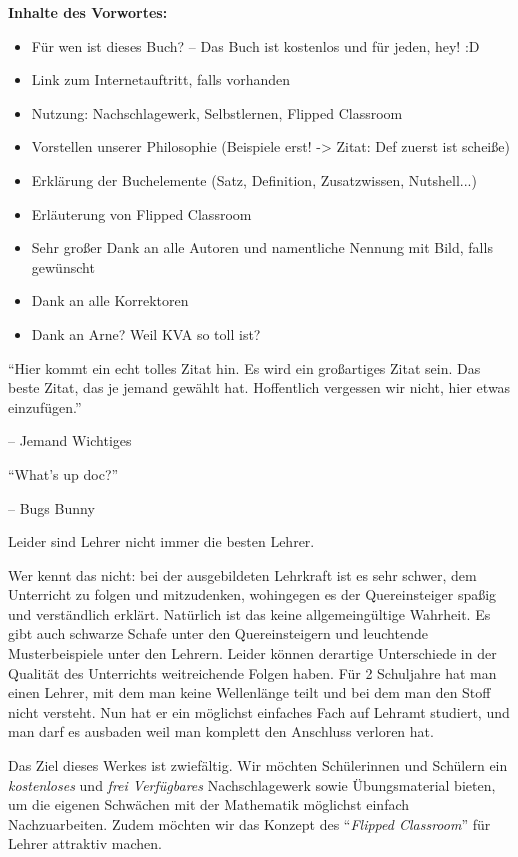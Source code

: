 \documentclass[../main.tex]{subfiles}
\begin{document}
\textbf{Inhalte des Vorwortes:}
\begin{itemize}
    \item Für wen ist dieses Buch? -- Das Buch ist kostenlos und für jeden, hey! :D
    \item Link zum Internetauftritt, falls vorhanden
    \item Nutzung: Nachschlagewerk, Selbstlernen, Flipped Classroom
    \item Vorstellen unserer Philosophie (Beispiele erst! -> Zitat: Def zuerst ist scheiße)
    \item Erklärung der Buchelemente (Satz, Definition, Zusatzwissen, Nutshell...)
    \item Erläuterung von Flipped Classroom
    \item Sehr großer Dank an alle Autoren und namentliche Nennung mit Bild, falls gewünscht
    \item Dank an alle Korrektoren
    \item Dank an Arne? Weil KVA so toll ist?
\end{itemize}

\epigraph{\enquote{Hier kommt ein echt tolles Zitat hin. Es wird ein großartiges Zitat sein. Das beste Zitat, das je jemand gewählt hat. Hoffentlich vergessen wir nicht, hier etwas einzufügen.}}{-- Jemand Wichtiges}
\epigraph{\enquote{What's up doc?}}{-- Bugs Bunny}
\fi

Leider sind Lehrer nicht immer die besten Lehrer.

Wer kennt das nicht: bei der ausgebildeten Lehrkraft ist es sehr schwer, dem Unterricht zu folgen und mitzudenken, wohingegen es der Quereinsteiger spaßig und verständlich erklärt. Natürlich ist das keine allgemeingültige Wahrheit. Es gibt auch schwarze Schafe unter den Quereinsteigern und leuchtende Musterbeispiele unter den Lehrern. Leider können derartige Unterschiede in der Qualität des Unterrichts weitreichende Folgen haben. Für 2 Schuljahre hat man einen Lehrer, mit dem man keine Wellenlänge teilt und bei dem man den Stoff nicht versteht. Nun hat er ein möglichst einfaches Fach auf Lehramt studiert, und man darf es ausbaden weil man komplett den Anschluss verloren hat.

Das Ziel dieses Werkes ist zwiefältig. Wir möchten Schülerinnen und Schülern ein \emph{kostenloses} und \emph{frei Verfügbares} Nachschlagewerk sowie Übungsmaterial bieten, um die eigenen Schwächen mit der Mathematik möglichst einfach Nachzuarbeiten. Zudem möchten wir das Konzept des \enquote{\emph{Flipped Classroom}} für Lehrer attraktiv machen.
\end{document}
